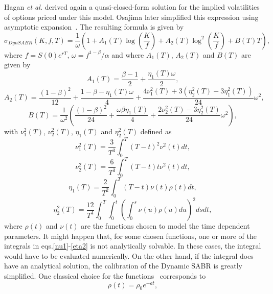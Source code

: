 Hagan \textit{et al.} derived again a quasi-closed-form solution for the implied volatilities of options priced under this model. Osajima later simplified this expression using asymptotic expansion~\cite{Osajima}. The resulting formula is given by
\begin{equation}\label{dynsabr}
\sigma_{DynSABR}(K,f,T)=\frac{1}{\omega}\left(1+A_1(T)\log\left(\frac{K}{f}\right)+A_2(T)\log^2\left(\frac{K}{f}\right)+B(T)T\right),
\end{equation}
\noindent where $f=S(0)e^{rT}$, $\omega=f^{1-\beta}/\alpha$ and where $A_1(T)$, $A_2(T)$ and $B(T)$ are given by
\begin{equation}
A_1(T)=\frac{\beta-1}{2}+\frac{\eta_1(T)\omega}{2},
\end{equation}
\begin{equation}
A_2(T)=\frac{(1-\beta)^2}{12}+\frac{1-\beta-\eta_1(T)\omega}{4}+\frac{4\nu_1^2(T)+3(\eta_2^2(T)-3\eta_1^2(T))}{24}\omega^2,
\end{equation}
\begin{equation}
B(T)=\frac{1}{\omega^2}\left(\frac{(1-\beta)^2}{24}+\frac{\omega\beta\eta_1(T)}{4}+\frac{2\nu_2^2(T)-3\eta_2^2(T)}{24}\omega^2\right),
\end{equation}
\noindent with $\nu_1^2(T)$, $\nu_2^2(T)$, $\eta_1(T)$ and $\eta_2^2(T)$ defined as
\begin{equation}\label{nu1}
\nu_1^2(T)=\frac{3}{T^3}\int_0^T(T-t)^2\nu^2(t)dt,
\end{equation}
\begin{equation}
\nu_2^2(T)=\frac{6}{T^3}\int_0^T(T-t)t\nu^2(t)dt,
\end{equation}
\begin{equation}
\eta_1(T)=\frac{2}{T^2}\int_0^T(T-t)\nu(t)\rho(t)dt,
\end{equation}
\begin{equation}\label{eta2}
\eta_2^2(T)=\frac{12}{T^4}\int_0^T\int_0^t\left(\int_0^s\nu(u)\rho(u)du\right)^2dsdt,
\end{equation}
\noindent where $\rho(t)$ and $\nu(t)$ are the functions chosen to model the time dependent parameters.
It might happen that, for some chosen functions, one or more of the integrals in eqs.\eqref{nu1}-\eqref{eta2} is not analytically  solvable. In these cases, the integral would have to be evaluated numerically. On the other hand, if the integral does have an analytical solution, the calibration of the Dynamic SABR is greatly simplified.
One classical choice for the functions~\cite{Fernandez} corresponds to
\begin{equation}\label{rhot}
\rho(t)=\rho_0e^{-at},
\end{equation}
